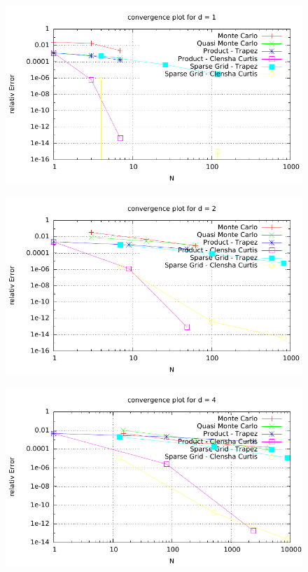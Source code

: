 \documentclass{article}
\begin{document}
\begin{figure}[htbp]
  \centering
     \includegraphics[width=1.0\textwidth]{../Task13/sh3_task13_convergencePlotd1.pdf}
\end{figure}

\begin{figure}[htbp]
  \centering
     \includegraphics[width=1.0\textwidth]{../Task13/sh3_task13_convergencePlotd2.pdf}
\end{figure}

\begin{figure}[htbp]
  \centering
     \includegraphics[width=1.0\textwidth]{../Task13/sh3_task13_convergencePlotd4.pdf}
\end{figure}
\end{document}
